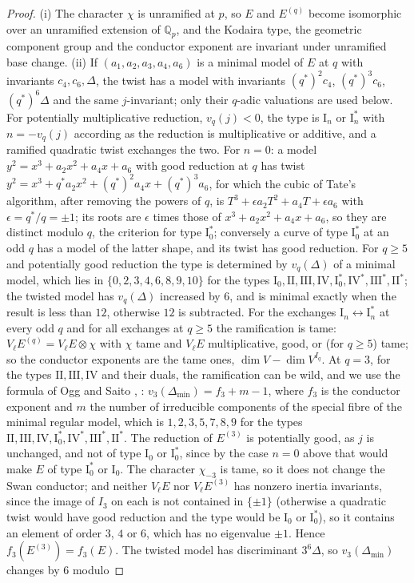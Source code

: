 \documentclass[11pt]{amsart}
\theoremstyle{definition}
\newcommand{\Q}{\mathbb{Q}}
\begin{document}
\begin{proof}
(i) The character $\chi$ is unramified at $p$, so $E$ and $E^{(q)}$ become isomorphic over an unramified extension of $\Q_p$, and the Kodaira type, the geometric component group and the conductor exponent are invariant under unramified base change. (ii) If $(a_1,a_2,a_3,a_4,a_6)$ is a minimal model of $E$ at $q$ with invariants $c_4,c_6,\Delta$, the twist has a model with invariants $(q^*)^{2}c_4$, $(q^*)^{3}c_6$, $(q^*)^{6}\Delta$ and the same $j$-invariant; only their $q$-adic valuations are used below. For potentially multiplicative reduction, $v_q(j)<0$, the type is $\mathrm{I}_n$ or $\mathrm{I}_n^*$ with $n=-v_q(j)$ according as the reduction is multiplicative or additive, and a ramified quadratic twist exchanges the two. For $n=0$: a model $y^2=x^3+a_2x^2+a_4x+a_6$ with good reduction at $q$ has twist $y^2=x^3+q^*a_2x^2+(q^*)^2a_4x+(q^*)^3a_6$, for which the cubic of Tate's algorithm, after removing the powers of $q$, is $T^3+\epsilon a_2T^2+a_4T+\epsilon a_6$ with $\epsilon=q^*/q=\pm1$; its roots are $\epsilon$ times those of $x^3+a_2x^2+a_4x+a_6$, so they are distinct modulo $q$, the criterion for type $\mathrm{I}_0^*$; conversely a curve of type $\mathrm{I}_0^*$ at an odd $q$ has a model of the latter shape, and its twist has good reduction. For $q\ge5$ and potentially good reduction the type is determined by $v_q(\Delta)$ of a minimal model, which lies in $\{0,2,3,4,6,8,9,10\}$ for the types $\mathrm{I}_0,\mathrm{II},\mathrm{III},\mathrm{IV},\mathrm{I}_0^*,\mathrm{IV}^*,\mathrm{III}^*,\mathrm{II}^*$; the twisted model has $v_q(\Delta)$ increased by $6$, and is minimal exactly when the result is less than $12$, otherwise $12$ is subtracted. For the exchanges $\mathrm{I}_n\leftrightarrow\mathrm{I}_n^*$ at every odd $q$ and for all exchanges at $q\ge5$ the ramification is tame: $V_\ell E^{(q)}=V_\ell E\otimes\chi$ with $\chi$ tame and $V_\ell E$ multiplicative, good, or (for $q\ge5$) tame; so the conductor exponents are the tame ones, $\dim V-\dim V^{I_q}$. At $q=3$, for the types $\mathrm{II},\mathrm{III},\mathrm{IV}$ and their duals, the ramification can be wild, and we use the formula of Ogg and Saito \cite{Ogg,Saito88}, \cite[IV.11]{SilvermanATAEC}: $v_3(\Delta_{\min})=f_3+m-1$, where $f_3$ is the conductor exponent and $m$ the number of irreducible components of the special fibre of the minimal regular model, which is $1,2,3,5,7,8,9$ for the types $\mathrm{II},\mathrm{III},\mathrm{IV},\mathrm{I}_0^*,\mathrm{IV}^*,\mathrm{III}^*,\mathrm{II}^*$. The reduction of $E^{(3)}$ is potentially good, as $j$ is unchanged, and not of type $\mathrm{I}_0$ or $\mathrm{I}_0^*$, since by the case $n=0$ above that would make $E$ of type $\mathrm{I}_0^*$ or $\mathrm{I}_0$. The character $\chi_{-3}$ is tame, so it does not change the Swan conductor; and neither $V_\ell E$ nor $V_\ell E^{(3)}$ has nonzero inertia invariants, since the image of $I_3$ on each is not contained in $\{\pm1\}$ (otherwise a quadratic twist would have good reduction and the type would be $\mathrm{I}_0$ or $\mathrm{I}_0^*$), so it contains an element of order $3$, $4$ or $6$, which has no eigenvalue $\pm1$. Hence $f_3(E^{(3)})=f_3(E)$. The twisted model has discriminant $3^6\Delta$, so $v_3(\Delta_{\min})$ changes by $6$ modulo 
\end{proof}
\end{document}
